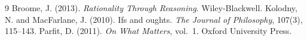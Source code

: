 \documentclass{situationist-preprint}
\begin{document}
\begin{thebibliography}{9}\small
{} Broome, J. (2013). \emph{Rationality Through Reasoning}. Wiley-Blackwell.
 Kolodny, N. and MacFarlane, J. (2010). Ifs and oughts. \emph{The Journal of Philosophy}, 107(3), 115--143.
 Parfit, D. (2011). \emph{On What Matters}, vol.~1. Oxford University Press.
\end{thebibliography}
\end{document}

